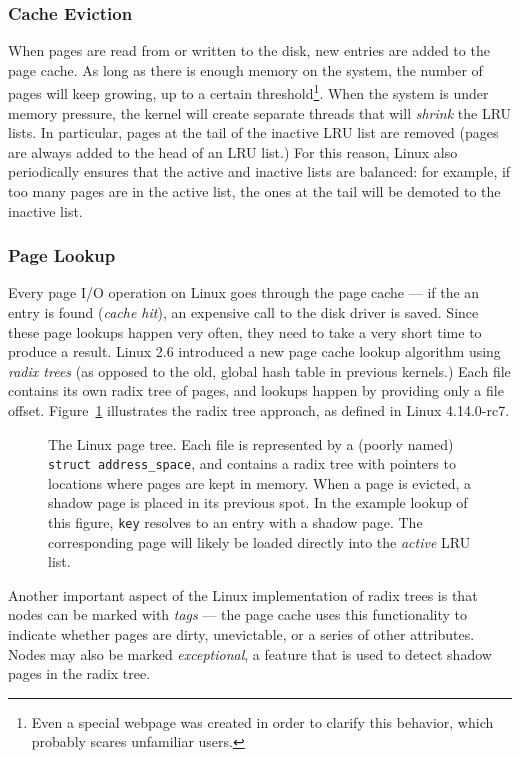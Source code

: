 \subsubsection{Cache Eviction}

When pages are read from or written to the disk, new entries are added to the
page cache.  As long as there is enough memory on the system, the number of
pages will keep growing, up to a certain threshold\footnote{Even a special
	webpage was \cite{lamr} created in order to clarify this behavior, which
	probably scares unfamiliar users.}. When the system is under memory pressure,
the kernel will create separate threads that will \emph{shrink} the LRU lists.
In particular, pages at the tail of the inactive LRU list are removed (pages
are always added to the head of an LRU list.) For this reason, Linux also
periodically ensures that the active and inactive lists are balanced: for
example, if too many pages are in the active list, the ones at the tail will be
demoted to the inactive list.

\subsubsection{Page Lookup}

Every page I/O operation on Linux goes through the page cache --- if the an
entry is found (\emph{cache hit}), an expensive call to the disk driver is
saved. Since these page lookups happen very often, they need to take a very
short time to produce a result. Linux 2.6 introduced a new page cache lookup
algorithm using \emph{radix trees} (as opposed to the old, global hash table in
previous kernels.) Each file contains its own radix tree of pages, and lookups
happen by providing only a file offset. Figure~\ref{fig:radix} illustrates the
radix tree approach, as defined in Linux 4.14.0-rc7.

\begin{figure}[h]
	\caption{The Linux page tree. Each file is represented by a (poorly named)
		\texttt{struct address\_space}, and contains a radix tree with pointers to
		locations where pages are kept in memory. When a page is evicted, a shadow
		page is placed in its previous spot. In the example lookup of this figure,
		\texttt{key} resolves to an entry with a shadow page. The corresponding page
		will likely be loaded directly into the \emph{active} LRU list.}
	\label{fig:radix}
\end{figure}

Another important aspect of the Linux implementation of radix trees is that nodes
can be marked with \emph{tags} --- the page cache uses this functionality to
indicate whether pages are dirty, unevictable, or a series of other attributes.
Nodes may also be marked \emph{exceptional}, a feature that is used to detect
shadow pages in the radix tree.

